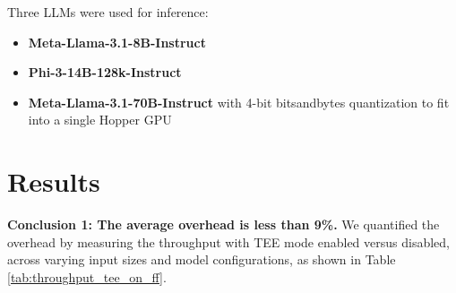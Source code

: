 \documentclass{article}
\begin{document}
Three LLMs were used for inference:

\begin{itemize}
    \item \textbf{Meta-Llama-3.1-8B-Instruct}
    \item \textbf{Phi-3-14B-128k-Instruct}
    \item \textbf{Meta-Llama-3.1-70B-Instruct} with 4-bit bitsandbytes quantization to fit into a single Hopper GPU
\end{itemize}

\section{Results}

\noindent\textbf{Conclusion 1: The average overhead is less than 9\%.} We quantified the overhead by measuring the throughput with TEE mode enabled versus disabled, across varying input sizes and model configurations, as shown in Table \ref{tab:throughput_tee_on_ff}.
\end{document}
